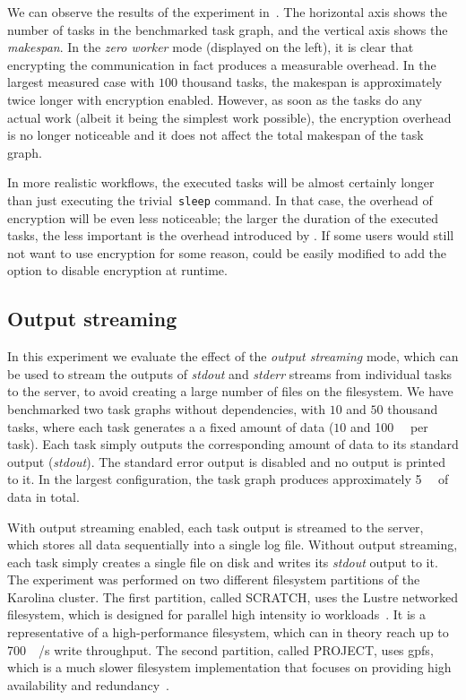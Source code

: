 We can observe the results of the experiment in~. The horizontal axis shows
the number of tasks in the benchmarked task graph, and the vertical axis shows the
\emph{makespan}. In the \emph{zero worker} mode (displayed on the left), it is clear
that encrypting the communication in fact produces a measurable overhead. In the largest measured
case with $100$ thousand tasks, the makespan is approximately twice longer with
encryption enabled. However, as soon as the tasks do any actual work (albeit it being the simplest
work possible), the encryption overhead is no longer noticeable and it does not affect the total
makespan of the task graph.

In more realistic workflows, the executed tasks will be almost certainly longer than just executing
the trivial~\texttt{sleep} command. In that case, the overhead of encryption will be even
less noticeable; the larger the duration of the executed tasks, the less important is the overhead
introduced by \hyperqueue{}. If some users would still not want to use encryption for
some reason, \hyperqueue{} could be easily modified to add the option to disable
encryption at runtime.

\subsection{Output streaming}
\label{sec:hq-exp-output-streaming}
In this experiment we evaluate the effect of the \emph{output streaming} mode, which can be used to
stream the outputs of \emph{stdout} and \emph{stderr} streams from individual
tasks to the \hyperqueue{} server, to avoid creating a large number of files on the
filesystem. We have benchmarked two task graphs without dependencies, with $10$
and $50$ thousand tasks, where each task generates a a fixed amount of data
($10$ and \SI{100}{\kibi\byte} per task). Each task simply outputs the
corresponding amount of data to its standard output (\emph{stdout}). The standard error
output is disabled and no output is printed to it. In the largest configuration, the task graph
produces approximately \SI{5}{\gibi\byte} of data in total.

With output streaming enabled, each task output is streamed to the server, which stores all data
sequentially into a single log file. Without output streaming, each task simply creates a single
file on disk and writes its \emph{stdout} output to it. The experiment was performed on
two different filesystem partitions of the Karolina cluster. The first partition, called SCRATCH,
uses the Lustre networked filesystem, which is designed for parallel high intensity
\gls{io} workloads~\cite{karolina_scratch}. It is a representative of a
high-performance filesystem, which can in theory reach up to \SI{700}{\gibi\byte}/s write
throughput. The second partition, called PROJECT, uses \gls{gpfs}, which is a much
slower filesystem implementation that focuses on providing high availability and
redundancy~\cite{karolina_project}.

